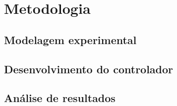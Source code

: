 \chapter{Metodologia}
\label{ch:metodologia}


\section{Modelagem experimental}
\label{sec:modelagem_experimental}


\section{Desenvolvimento do controlador}
\label{sec:desenvolvimento_do_controlador}


\section{Análise de resultados}
\label{sec:analise_de_resultados}

